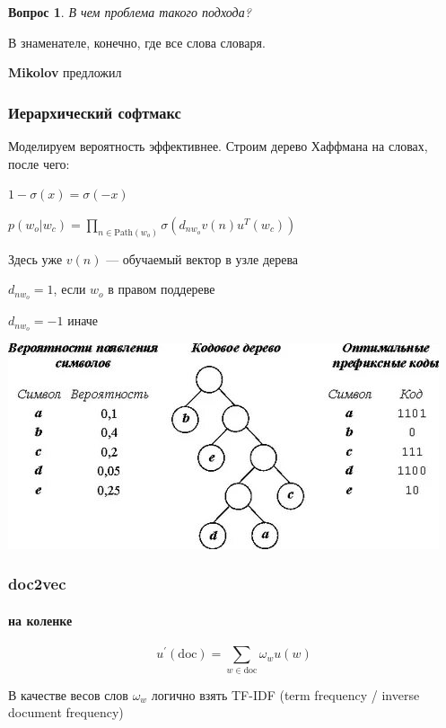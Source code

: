 \documentclass[fullscreen=true, bookmarks=true, hyperref={pdfencoding=unicode}]{beamer}
\newtheorem*{question}{Вопрос}
\begin{document}
\begin{frame}
  \begin{question}
    В чем проблема такого подхода?
  \end{question}

  \pause
  В знаменателе, конечно, где все слова словаря.


  \pause
  \vspace{1cm}
  {\bf Mikolov} предложил
\end{frame}


\begin{frame}
  \frametitle{Иерархический софтмакс}
  Моделируем вероятность эффективнее. Строим дерево Хаффмана на словах, после чего:

  $1 - \sigma(x) = \sigma(-x)$

  $p(w_o|w_c) = \prod\limits_{n \in \text{Path}(w_o)} \sigma(d_{nw_o} v(n) u^T(w_c))$

  Здесь уже $v(n)$ — обучаемый вектор в узле дерева

  $d_{nw_o} = 1$, если $w_o$ в правом поддереве

  $d_{nw_o} = -1$ иначе

  \begin{center}
    \includegraphics[keepaspectratio,
                     width=.5\paperwidth]{haffman.jpeg}
  \end{center}
\end{frame}


\begin{frame}
  \frametitle{doc2vec}
  \framesubtitle{на коленке}

  $$u^\prime (\text{doc}) = \sum\limits_{w \in \text{doc}} \omega_wu(w)$$

  \vspace{1cm}
  В качестве весов слов $\omega_w$ логично взять TF-IDF (term frequency / inverse document frequency)
\end{frame}
\end{document}
